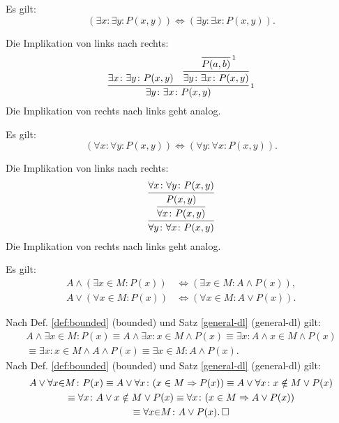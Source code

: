 \begin{Satz}\label{exists-cl}
Es gilt:
\[(\exists x\colon\exists y\colon P(x,y)) \iff (\exists y\colon\exists x\colon P(x,y)).\]
\end{Satz}
\begin{Beweis}
Die Implikation von links nach rechts:
\[\infer[\infernote{1}]{\exists y\colon\exists x\colon P(x,y)}{
  \exists x\colon\exists y\colon P(x,y)
  &
  \infer{\exists y\colon \exists x\colon P(x, y)}{
    \infer[\infernote{1}]{P(a,b)}{}}
}\]
Die Implikation von rechts nach links geht analog.\,\qedsymbol
\end{Beweis}

\begin{Satz}\label{all-cl}
Es gilt:
\[(\forall x\colon\forall y\colon P(x,y))
\iff (\forall y\colon\forall x\colon P(x,y)).\]
\end{Satz}
\begin{Beweis}[Beweis]
Die Implikation von links nach rechts:
\[\infer{\forall y\colon\forall x\colon P(x,y)}{
  \infer{\forall x\colon P(x,y)}{
    \infer{P(x,y)}{\forall x\colon\forall y\colon P(x,y)}}
}\]
Die Implikation von rechts nach links geht analog.\,\qedsymbol
\end{Beweis}

\begin{Satz}%
\label{bounded-general-dl}
Es gilt:
\begin{align}
A\land (\exists x{\in}M\colon P(x)) &\iff (\exists x{\in}M\colon A\land P(x)),\\
A\lor (\forall x{\in}M\colon P(x)) &\iff (\forall x{\in}M\colon A\lor P(x)).
\end{align}
\end{Satz}

\begin{Beweis}
Nach Def. \ref{def:bounded} (bounded)
und Satz \ref{general-dl} (general-dl) gilt:
\begin{gather*}
A\land \exists x{\in}M\colon P(x)
\equiv A\land \exists x\colon x\in M\land P(x)
\equiv \exists x\colon A\land x\in M\land P(x)\\
\equiv \exists x\colon x\in M\land A\land P(x)
\equiv \exists x{\in}M\colon A\land P(x).
\end{gather*}
Nach Def. \ref{def:bounded} (bounded)
und Satz \ref{general-dl} (general-dl) gilt:
\begin{gather*}
A\lor\forall x{\in}M\colon P(x)
\equiv A\lor\forall x\colon (x\in M\Rightarrow P(x))
\equiv A\lor\forall x\colon x\notin M\lor P(x)\\
\equiv \forall x\colon A\lor x\notin M\lor P(x)
\equiv \forall x\colon (x\in M\Rightarrow A\lor P(x))\\
\equiv \forall x{\in}M\colon A\lor P(x).\,\square
\end{gather*}
\end{Beweis}

